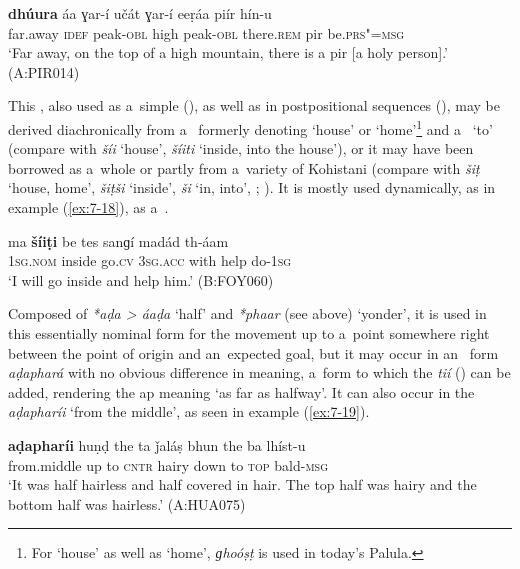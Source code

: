 \begin{exe}
\ex
\label{ex:7-17b}
\gll \textbf{dhúura} áa ɣar-í učát ɣar-í eeṛáa piír hín-u \\
far.away \textsc{idef} peak-\textsc{obl} high peak-\textsc{obl} there.\textsc{rem} pir be.\textsc{prs"=msg}\\
\glt `Far away, on the top of a high mountain, there is a pir [a holy person].' (A:PIR014)
\end{exe}


 This , also used as a~simple 
(), as well as in postpositional sequences (), may be derived diachronically from
a~ formerly denoting `house' or `home'\footnote{For `house' as well as `home',
  \textit{ɡhoóṣṭ} is used in today's Palula.} and a~ `to' (compare with \iliKalkoti
\textit{šíi} `house', \textit{šíiti} `inside, into the house'), or it may have been borrowed
as a~whole or partly from a~variety of Kohistani (compare with \iliGawri \textit{šiṭ} `house, home',
\textit{šiṭši} `inside', \textit{ši} `in, into', \citealt[119]{baart1997}; \citeyear[76]{baart1999a}). It is mostly used
dynamically, as in example (\ref{ex:7-18}), as a~.

\begin{exe}
\ex
\label{ex:7-18}
\gll ma \textbf{šíiṭi} be tes sanɡí madád th-áam \\
\textsc{1sg.nom} inside go.\textsc{cv} \textsc{3sg.acc} with help do-\textsc{1sg}\\
\glt `I will go inside and help him.' (B:FOY060)
\end{exe}

 Composed of \textit{*aḍa {\textgreater} áaḍa} `half' and \textit{*phaar} (see above) `yonder', it is used in this essentially nominal form for the movement up to a~point somewhere right between the point of origin and an~expected goal, but it may occur in an~ form \textit{aḍaphará} with no obvious difference in meaning, a~form to which the  \textit{tií} () can be added, rendering the ap meaning `as far as halfway'. It can also occur in the  \textit{aḍapharíi} `from the middle', as seen in example (\ref{ex:7-19}). 
\begin{exe}
\ex
\label{ex:7-19}
\gll \textbf{aḍapharíi} huṇḍ the ta ǰaláṣ bhun the ba lhíst-u \\
from.middle up to \textsc{cntr} hairy down to \textsc{top} bald-\textsc{msg}\\
\glt `It was half hairless and half covered in hair. The top half was hairy and the bottom half was hairless.' (A:HUA075)
\end{exe}

